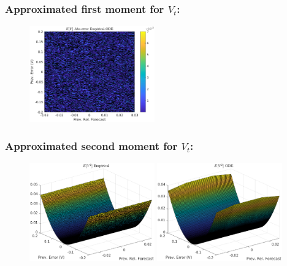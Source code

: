 \documentclass[aspectratio=169]{beamer}\usepackage[utf8]{inputenc}
\begin{document}
\begin{frame}\frametitle{Approximated first moment for $V_t$:} \label{EM1}

\begin{figure}[ht!]
\centering
\includegraphics[width=0.48\textwidth]{../../MATLAB_Files/Results/moments/classic/3.eps}
\end{figure}

\end{frame}


\begin{frame}\frametitle{Approximated second moment for $V_t$:}

\begin{figure}[ht!]
\centering
\includegraphics[width=0.48\textwidth]{../../MATLAB_Files/Results/moments/classic/4.eps}\quad
\includegraphics[width=0.48\textwidth]{../../MATLAB_Files/Results/moments/classic/5.eps}
\end{figure}

\end{frame}
\end{document}
